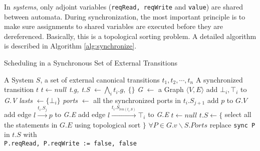 In \lang{} \emph{systems}, only adjoint variables (\texttt{reqRead, reqWrite} and \texttt{value}) are shared between automata. During synchronization, the most important principle is to make sure assignments to shared variables are executed before they are dereferenced. Basically, this is a topological sorting problem. A detailed algorithm is described in Algorithm \ref{alg:synchronize}.

\begin{algorithm}[t]
    \caption{Scheduling in a Synchronous Set of External Transitions}
    \label{alg:synchronize}
    \begin{algorithmic}[1]
        \REQUIRE A System $S$, a set of external canonical transitions $t_1,t_2,\cdots,t_n$
        \ENSURE A synchronized transition $t$
            \STATE $t\leftarrow null$
            \RETURN
        \ENDIF
        \STATE \emph{t.g, t.S} $\leftarrow \bigwedge_i t_i.g,\:\{\}$
        \STATE 
        \STATE  \emph{G} $\leftarrow$ a Graph $\langle V,E\rangle$
            \STATE add $\bot_i, \top_i$ to \emph{G.V}
            \STATE \emph{lasts} $\leftarrow\{\bot_i\}$
                \STATE \emph{ports} $\leftarrow$ all the synchronized ports in $t_i.S_{j+1}$
                        \STATE add $p$ to $G.V$
                    \ENDIF
                    \STATE add edge $l \xrightarrow{t_i.S_j} p$ to \emph{G.E}
                \ENDFOR 
            \ENDFOR
                \STATE add edge $l \xrightarrow{t_i.S_{len(t_i.S)}} \top_i$ to \emph{G.E}
            \ENDFOR 
        \ENDFOR
        \STATE
            \STATE $t\leftarrow null$
        \ELSE
            \STATE $t.S\leftarrow\{$ select all the statements in $G.E$ using topological sort $\}$
            \STATE $\forall P\in G.v\backslash S.Ports$ replace \texttt{sync P} in $t.S$ with \\ \hspace{1em} \texttt{P.reqRead, P.reqWrite := false, false}
        \ENDIF
    \end{algorithmic}
\end{algorithm}

